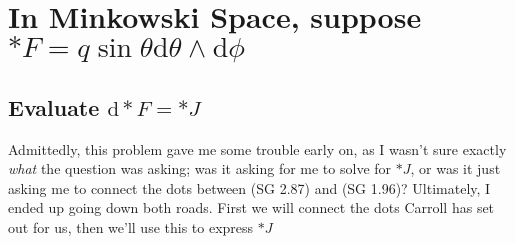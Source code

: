 \section{In Minkowski Space, suppose $ \ast F = q  \sin{\theta}  \textrm{d} \theta \wedge \textrm{d} \phi$}


\subsection{Evaluate  $ \textrm{d} \ast F = \ast J $}

Admittedly, this problem gave me some trouble early on, as I wasn't sure exactly \textit{what} the question was asking; was it asking for me to solve for $ \ast J $, or was it just asking me to connect the dots between (SG 2.87) and (SG 1.96)? Ultimately, I ended up going down both roads. First we will connect the dots Carroll has set out for us, then we'll use this to express $ \ast J $ 

